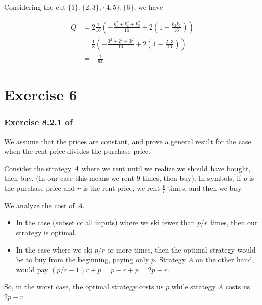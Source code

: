 \documentclass{article}
\begin{document}
Considering the cut \(\{1\}, \{2,3\}, \{4,5\}, \{6\}\), we have

\begin{align*}
    Q &= 2 \frac{1}{16}
        \left(
            -\frac{k_1^2 + k_2^2 + k_3^2}{16}
            + 2 \left( 1 - \frac{k_2 k_3}{16} \right)
         \right)\\
      &= \frac{1}{8}
      \left(
        -\frac{3^2 + 2^2 + 3^2}{16}
        + 2 \left( 1 - \frac{2 \cdot 3}{16} \right)
     \right)\\
     &= -\frac{1}{64}
\end{align*}


\section*{Exercise 6}

\subsubsection*{Exercise 8.2.1 of \cite{mmds}}


We assume that the prices are constant, and prove a general result
for the case when the rent price divides the purchase price.

Consider the strategy \(A\) where
we rent until we realize we should have bought, then buy.
(In our case this means we rent 9 times, then buy).
In symbols, if \(p\) is the purchase price and \(r\) is the rent price,
we rent \(\frac{p}{r}\) times, and then we buy.

We analyze the cost of \(A\).

\begin{itemize}
    \item In the case (subset of all inputs) where we ski
        fewer than \(p / r\) times, then our strategy is optimal.
    \item In the case where we ski \(p / r\) or more times,
        then the optimal strategy would be to buy from the beginning,
        paying only \(p\).
        Strategy \(A\) on the other hand, would pay
        \((p/r - 1) r + p = p - r + p = 2p - r\).
\end{itemize}

So, in the worst case, the optimal strategy costs us \(p\)
while strategy \(A\) costs us \(2p - r\).
\end{document}
